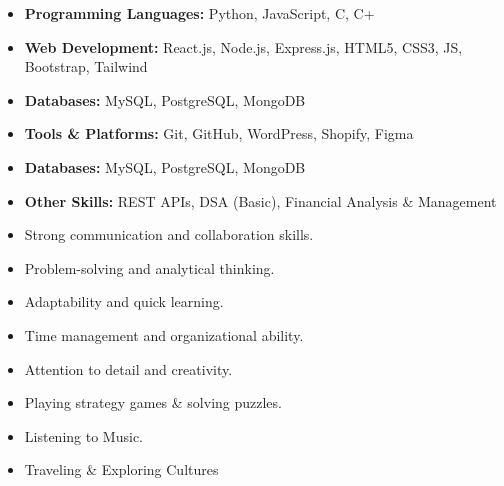 \documentclass[10pt,a4paper,ragged2e]{altacv}
\begin{document}
\smallskip
\begin{itemize}
\item \textbf{Programming Languages: }Python, JavaScript, C, C+
\smallskip
\item \textbf{Web Development: }React.js, Node.js, Express.js, HTML5, CSS3, JS, Bootstrap, Tailwind
\smallskip
\item \textbf{Databases: }MySQL, PostgreSQL, MongoDB
\smallskip
\item  \textbf{Tools \& Platforms:} Git, GitHub, WordPress, Shopify, Figma 
\smallskip
\item \textbf{Databases: }MySQL, PostgreSQL, MongoDB
\smallskip
\item \textbf{Other Skills:} REST APIs, DSA (Basic), Financial Analysis \& Management 
\smallskip


\end{itemize}
\smallskip
\begin{itemize}
\item Strong communication and collaboration skills.
\smallskip
\item Problem-solving and analytical thinking.
\smallskip
\item Adaptability and quick learning.
\smallskip
\item Time management and organizational ability.
\smallskip
\item Attention to detail and creativity.
\smallskip
\end{itemize}

\smallskip
\begin{itemize}
\item Playing strategy games \& solving puzzles.
\smallskip
\item Listening to Music.
\smallskip
\item Traveling \& Exploring Cultures
\end{itemize}

\clearpage
\end{document}
